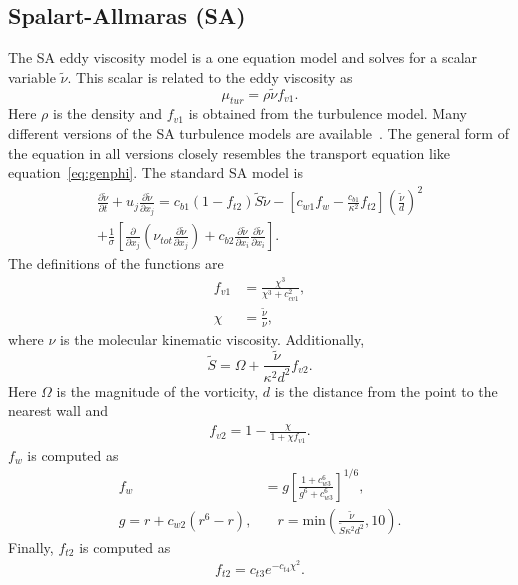 \subsection{Spalart-Allmaras (SA)}
The SA eddy viscosity model is a one equation model and solves for a scalar variable $\tilde{\nu}$. This scalar is related to the eddy viscosity as
\begin{equation}
\mu_{tur} = \rho \tilde{\nu} f_{v1}.
\end{equation}
Here $\rho$ is the density and $f_{v1}$ is obtained from the turbulence model. Many different versions of the SA turbulence models are available~\cite{NASATMR}. The general form of the equation in all versions closely resembles the transport equation like equation~\ref{eq:genphi}. The standard SA model is
\begin{align}
\frac{\partial \tilde{\nu}}{\partial t} + u_j\frac{\partial \tilde{\nu}}{\partial x_j} = c_{b1}(1-f_{t2})\tilde{S}\tilde{\nu}-\left[c_{w1}f_w - \frac{c_{b1}}{\kappa^2}f_{t2} \right]\left(\frac{\tilde{\nu}}{d}\right)^2 \\+ \frac{1}{\sigma}\left[\frac{\partial}{\partial x_j}\left(\nu_{tot}\frac{\partial \tilde{\nu}}{\partial x_j}\right) + c_{b2}\frac{\partial \tilde{\nu}}{\partial x_i}\frac{\partial \tilde{\nu}}{\partial x_i}\right].\nonumber
\label{eq:saorig}
\end{align}
The definitions of the functions are
\begin{align}
f_{v1} &= \frac{\chi^3}{\chi^3 + c_{cv1}^2}, \nonumber \\
\chi &= \frac{\tilde{\nu}}{\nu},
\end{align}
where $\nu$ is the molecular kinematic viscosity. Additionally,
\begin{equation}
\tilde{S} = \Omega + \frac{\tilde{\nu}}{\kappa^2 d^2}f_{v2}.
\end{equation}
Here $\Omega$ is the magnitude of the vorticity, $d$ is the distance from the point to the nearest wall and
\begin{align}
f_{v2} = 1 - \frac{\chi}{1+\chi f_{v1}}.\nonumber 
\end{align}
$f_w$ is computed as
\begin{align}
f_w &= g\left[\frac{1+c_{w3}^6}{g^6+c_{w3}^6}\right]^{1/6},  \\
g = r + c_{w2}(r^6-r), &\quad r = \text{min}\left(\frac{\tilde{\nu}}{\tilde{S}\kappa^2d^2},10\right) \nonumber.
\end{align}
Finally, $f_{t2}$ is computed as
\begin{align}
f_{t2} = c_{t3}e^{-c_{t4}\chi^2} \nonumber.
\end{align}
